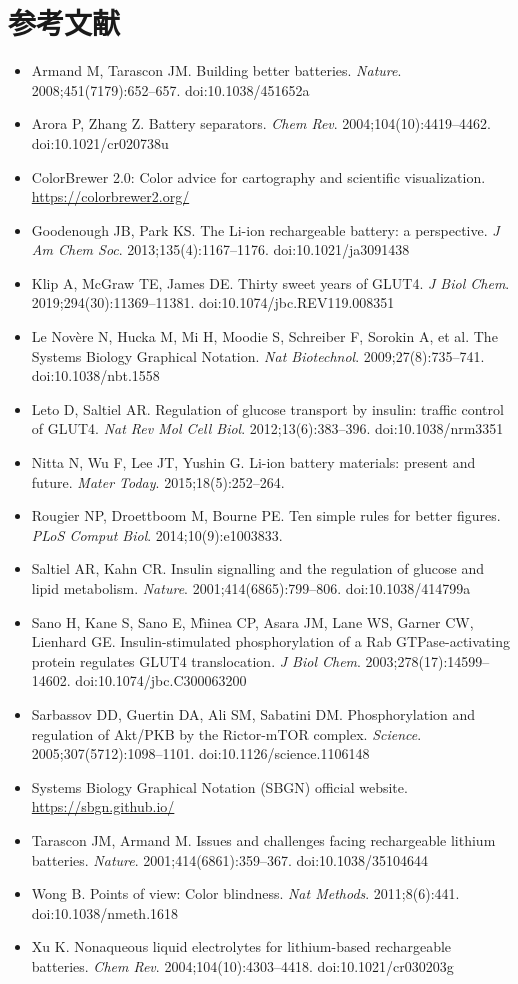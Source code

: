 \section*{参考文献}

\begin{itemize}
\item Armand M, Tarascon JM. Building better batteries. \emph{Nature}. 2008;451(7179):652--657. doi:10.1038/451652a
\item Arora P, Zhang Z. Battery separators. \emph{Chem Rev}. 2004;104(10):4419--4462. doi:10.1021/cr020738u
\item ColorBrewer 2.0: Color advice for cartography and scientific visualization. \url{https://colorbrewer2.org/}
\item Goodenough JB, Park KS. The Li-ion rechargeable battery: a perspective. \emph{J Am Chem Soc}. 2013;135(4):1167--1176. doi:10.1021/ja3091438
\item Klip A, McGraw TE, James DE. Thirty sweet years of GLUT4. \emph{J Biol Chem}. 2019;294(30):11369--11381. doi:10.1074/jbc.REV119.008351
\item Le Nov\`ere N, Hucka M, Mi H, Moodie S, Schreiber F, Sorokin A, et al. The Systems Biology Graphical Notation. \emph{Nat Biotechnol}. 2009;27(8):735--741. doi:10.1038/nbt.1558
\item Leto D, Saltiel AR. Regulation of glucose transport by insulin: traffic control of GLUT4. \emph{Nat Rev Mol Cell Biol}. 2012;13(6):383--396. doi:10.1038/nrm3351
\item Nitta N, Wu F, Lee JT, Yushin G. Li-ion battery materials: present and future. \emph{Mater Today}. 2015;18(5):252--264. 
\item Rougier NP, Droettboom M, Bourne PE. Ten simple rules for better figures. \emph{PLoS Comput Biol}. 2014;10(9):e1003833. 
\item Saltiel AR, Kahn CR. Insulin signalling and the regulation of glucose and lipid metabolism. \emph{Nature}. 2001;414(6865):799--806. doi:10.1038/414799a
\item Sano H, Kane S, Sano E, M\^{\i}inea CP, Asara JM, Lane WS, Garner CW, Lienhard GE. Insulin-stimulated phosphorylation of a Rab GTPase-activating protein regulates GLUT4 translocation. \emph{J Biol Chem}. 2003;278(17):14599--14602. doi:10.1074/jbc.C300063200
\item Sarbassov DD, Guertin DA, Ali SM, Sabatini DM. Phosphorylation and regulation of Akt/PKB by the Rictor-mTOR complex. \emph{Science}. 2005;307(5712):1098--1101. doi:10.1126/science.1106148
\item Systems Biology Graphical Notation (SBGN) official website. \url{https://sbgn.github.io/}
\item Tarascon JM, Armand M. Issues and challenges facing rechargeable lithium batteries. \emph{Nature}. 2001;414(6861):359--367. doi:10.1038/35104644
\item Wong B. Points of view: Color blindness. \emph{Nat Methods}. 2011;8(6):441. doi:10.1038/nmeth.1618
\item Xu K. Nonaqueous liquid electrolytes for lithium-based rechargeable batteries. \emph{Chem Rev}. 2004;104(10):4303--4418. doi:10.1021/cr030203g
\end{itemize}
